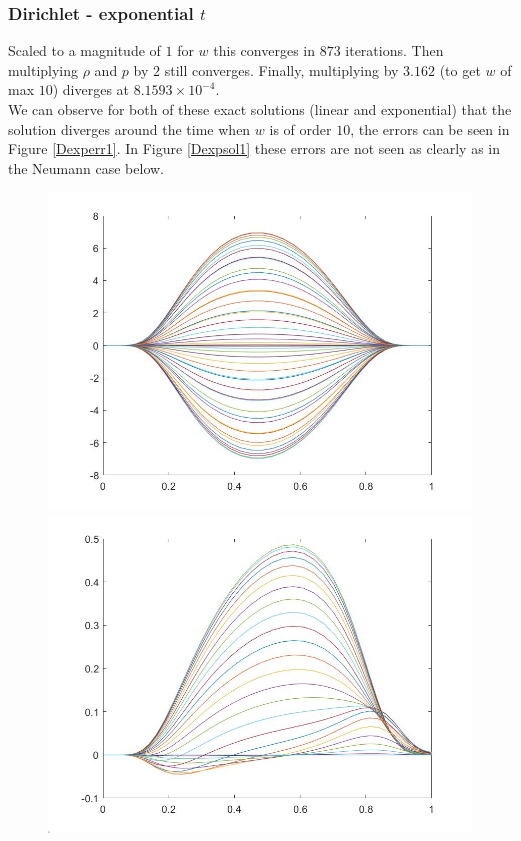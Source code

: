 \documentclass[11pt, a4paper]{article}
\theoremstyle{definition}
\begin{document}
\subsubsection{Dirichlet - exponential $t$}
Scaled to a magnitude of $1$ for $w$ this converges in $873$ iterations. Then multiplying $\rho$ and $p$ by $2$ still converges. Finally, multiplying by $3.162$ (to get $w$ of max $10$) diverges at $8.1593 \times 10^{-4}$.
\\
We can observe for both of these exact solutions (linear and exponential) that the solution diverges around the time when $w$ is of order $10$, the errors can be seen in Figure \ref{Dexperr1}. In Figure \ref{Dexpsol1} these errors are not seen as clearly as in the Neumann case below.
\begin{figure}[h]
	\includegraphics[scale=0.3]{Dexperr1.jpg}
	\includegraphics[scale=0.3]{Dexperr2.jpg}

\end{figure}
\end{document}
